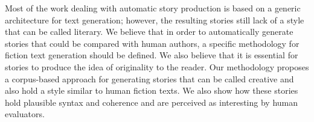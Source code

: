 Most of the work dealing with automatic story production is based on a generic architecture for text generation; however, the resulting stories still lack of a style that can be called literary. We believe that in order to automatically generate stories that could be compared with human authors, a specific methodology for fiction text generation should be defined. We also believe that it is essential for stories to produce the idea of originality to the reader. Our methodology proposes a corpus-based approach for generating stories that can be called creative and also hold a style similar to human fiction texts. We also show how these stories hold plausible syntax and coherence and are perceived as interesting by human evaluators.
